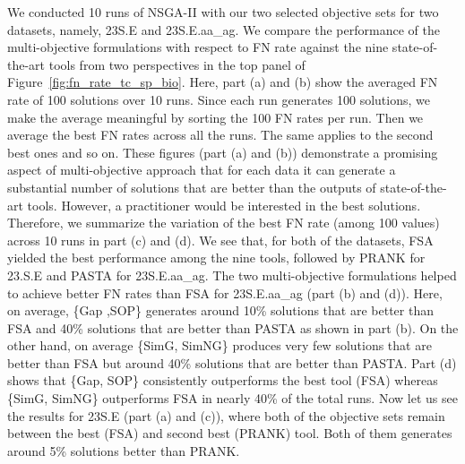 We conducted 10 runs of NSGA-II with our two selected objective sets for two datasets, namely, 23S.E and 23S.E.aa\_ag. 
We compare the performance of the multi-objective formulations with respect to FN rate against the nine state-of-the-art tools from two perspectives in the top panel of Figure~\ref{fig:fn_rate_tc_sp_bio}. Here, part (a) and (b) show the averaged FN rate of 100 solutions over 10 runs. Since each run generates 100 solutions, we make the average meaningful by sorting the 100 FN rates per run. Then we average the best FN rates across all the runs. The same applies to the second best ones and so on. These figures (part (a) and (b)) demonstrate a promising aspect of multi-objective approach that for each data it can generate a substantial number of solutions that are better than the outputs of state-of-the-art tools. However, a practitioner would be interested in the best solutions. Therefore, we summarize the variation of the best FN rate (among 100 values) across 10 runs in part (c) and (d). We see that, for both of the datasets, FSA yielded the best performance among the nine tools, followed by PRANK for 23.S.E and PASTA for 23S.E.aa\_ag. The two multi-objective formulations helped to achieve better FN rates than FSA for 23S.E.aa\_ag (part (b) and (d)). Here, on average, \{Gap ,SOP\} generates around 10\% solutions that are better than FSA and 40\% solutions that are better than PASTA as shown in part (b). On the other hand, on average \{SimG, SimNG\} produces very few solutions that are better than FSA but around 40\% solutions that are better than PASTA. Part (d) shows that \{Gap, SOP\} consistently outperforms the best tool (FSA) whereas \{SimG, SimNG\} outperforms FSA in nearly 40\% of the total runs. Now let us see the results for 23S.E (part (a) and (c)), where both of the objective sets remain between the best (FSA) and second best (PRANK) tool. Both of them generates around 5\% solutions better than PRANK.

